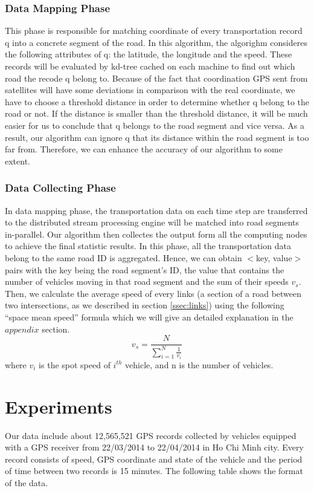 \documentclass{acm_proc_article-sp}
\begin{document}
\subsubsection{Data Mapping Phase} 
This phase is responsible for matching coordinate of every transportation record q into a concrete segment of the road. In this algorithm, the algorighm consideres the following attributes of q: the latitude, the longitude and the speed. These records will be evaluated by kd-tree cached on each machine to find out which road the recode q belong to. Because of the fact that coordination GPS sent from satellites will have some deviations in comparison with the real coordinate, we have to choose a threshold distance in order to determine whether q belong to the road or not. If the distance is smaller than the threshold distance, it will be much easier for us to conclude that q belongs to the road segment and vice versa. As a result, our algorithm can ignore q that its distance within the road segment is too far from. Therefore, we can enhance the accuracy of our algorithm to some extent.

\subsubsection{Data Collecting Phase} \label{datacollectingphase} In data mapping phase, the transportation data on each time step are transferred to the distributed stream processing engine will be matched into road segments in-parallel. Our algorithm then collectes the output form all the computing nodes to achieve the final statistic results.  In this phase, all the transportation data belong to the same road ID is aggregated. Hence, we can obtain $<$key, value$>$ pairs with the key being the road segment's ID, the value that contains the number of vehicles moving in that road segment and the sum of their speeds $v_{s}$. Then, we calculate the average speed of every links (a section of a road between two intersections, as we described in section \ref{ssec:links}) using the following ``space mean speed'' formula which we will give an detailed explanation in the $appendix$ section.
\[ v_{s} = \frac{N}{\sum_{i=1}^{N}\frac{1}{v_{i}}}\]
where $v_{i}$ is the spot speed of $i^{th}$ vehicle, and n is the number of vehicles.

\section{Experiments}
Our data include about 12,565,521 GPS records collected by vehicles equipped with a GPS receiver from 22/03/2014 to 22/04/2014 in Ho Chi Minh city. Every record consists of speed, GPS coordinate and state of the vehicle and the period of time between two records is 15 minutes. The following table shows the format of the data.
\end{document}

